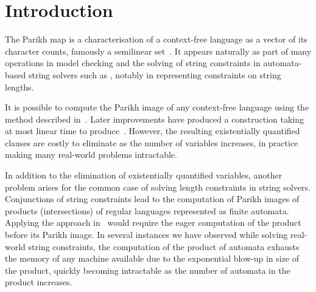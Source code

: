 \documentclass[acmsmall,review,anonymous,screen]{acmart}\settopmatter{printfolios=true,printccs=false,printacmref=true}
\theoremstyle{definition}
\begin{document}


\maketitle


\section{Introduction}

The Parikh map is a characterisation of a context-free language as a vector of
its character counts, famously a semilinear set~\cite{parikh-theorem}. It
appears naturally as part of many operations in model checking and the solving
of string constraints in automata-based string solvers such as \Ostrich{},
notably in representing constraints on string lengths.

It is possible to compute the Parikh image of any context-free language using
the method described in~\cite{generate-parikh-image}. Later improvements have
produced a construction taking at most linear time to
produce~\cite{muscholl-linear}. However, the resulting existentially quantified
clauses are costly to eliminate as the number of variables increases, in
practice making many real-world problems intractable.

In addition to the elimination of existentially quantified variables, another
problem arises for the common case of solving length constraints in string
solvers. Conjunctions of string constraints lead to the computation of Parikh
images of products (intersections) of regular languages represented as finite
automata. Applying the approach in~\cite{generate-parikh-image} would require
the eager computation of the product before its Parikh image. In several
instances we have observed while solving real-world string constraints, the
computation of the product of automata exhausts the memory of any machine
available due to the exponential blow-up in size of the product, quickly
becoming intractable as the number of automata in the product increases.
\end{document}
